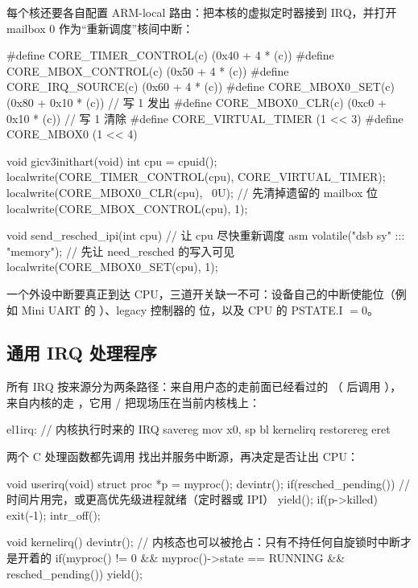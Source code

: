 每个核还要各自配置 ARM-local 路由：把本核的虚拟定时器接到 IRQ，并打开 mailbox 0 作为“重新调度”核间中断：

\begin{ccode}
#define CORE_TIMER_CONTROL(c) (0x40 + 4 * (c))
#define CORE_MBOX_CONTROL(c)  (0x50 + 4 * (c))
#define CORE_IRQ_SOURCE(c)    (0x60 + 4 * (c))
#define CORE_MBOX0_SET(c)     (0x80 + 0x10 * (c))   // 写 1 发出
#define CORE_MBOX0_CLR(c)     (0xc0 + 0x10 * (c))   // 写 1 清除
#define CORE_VIRTUAL_TIMER    (1 << 3)
#define CORE_MBOX0            (1 << 4)

void gicv3inithart(void)
{
  int cpu = cpuid();
  localwrite(CORE_TIMER_CONTROL(cpu), CORE_VIRTUAL_TIMER);
  localwrite(CORE_MBOX0_CLR(cpu), ~0U);     // 先清掉遗留的 mailbox 位
  localwrite(CORE_MBOX_CONTROL(cpu), 1);
}

void send_resched_ipi(int cpu)              // 让 cpu 尽快重新调度
{
  asm volatile("dsb sy" ::: "memory");      // 先让 need_resched 的写入可见
  localwrite(CORE_MBOX0_SET(cpu), 1);
}
\end{ccode}

一个外设中断要真正到达 CPU，三道开关缺一不可：设备自己的中断使能位（例如 Mini UART 的 ）、legacy 控制器的  位，以及 CPU 的 PSTATE.I $=0$。

\subsection{通用 IRQ 处理程序}

所有 IRQ 按来源分为两条路径：来自用户态的走前面已经看过的 （ 后调用 ），来自内核的走 ，它用 / 把现场压在当前内核栈上：

\begin{asmcode}
el1irq:                    // 内核执行时来的 IRQ
        savereg
        mov x0, sp
        bl kernelirq
        restorereg
        eret
\end{asmcode}

两个 C 处理函数都先调用  找出并服务中断源，再决定是否让出 CPU：

\begin{ccode}
void userirq(void)
{
  struct proc *p = myproc();
  devintr();
  if(resched_pending())      // 时间片用完，或更高优先级进程就绪（定时器或 IPI）
    yield();
  if(p->killed)
    exit(-1);
  intr_off();
}

void kernelirq()
{
  devintr();
  // 内核态也可以被抢占：只有不持任何自旋锁时中断才是开着的
  if(myproc() != 0 && myproc()->state == RUNNING && resched_pending())
    yield();
}
\end{ccode}

